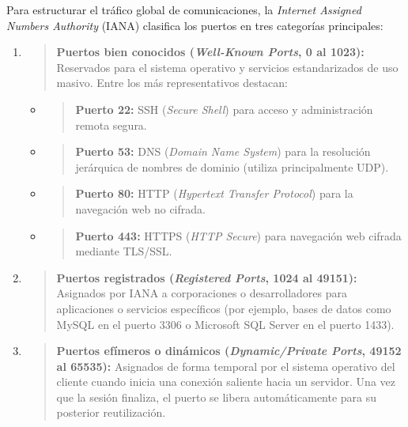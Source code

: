 
Para estructurar el tráfico global de comunicaciones, la \emph{Internet
Assigned Numbers Authority} (IANA) clasifica los puertos en tres
categorías principales:

\begin{enumerate}
\def\labelenumi{\arabic{enumi}.}
\item
  \begin{quote}
  \textbf{Puertos bien conocidos (\emph{Well-Known Ports}, 0 al 1023):}
  Reservados para el sistema operativo y servicios estandarizados de uso
  masivo. Entre los más representativos destacan:
  \end{quote}

  \begin{itemize}
  \item
    \begin{quote}
    \textbf{Puerto 22:} SSH (\emph{Secure Shell}) para acceso y
    administración remota segura.
    \end{quote}
  \item
    \begin{quote}
    \textbf{Puerto 53:} DNS (\emph{Domain Name System}) para la
    resolución jerárquica de nombres de dominio (utiliza principalmente
    UDP).
    \end{quote}
  \item
    \begin{quote}
    \textbf{Puerto 80:} HTTP (\emph{Hypertext Transfer Protocol}) para
    la navegación web no cifrada.
    \end{quote}
  \item
    \begin{quote}
    \textbf{Puerto 443:} HTTPS (\emph{HTTP Secure}) para navegación web
    cifrada mediante TLS/SSL.
    \end{quote}
  \end{itemize}
\item
  \begin{quote}
  \textbf{Puertos registrados (\emph{Registered Ports}, 1024 al 49151):}
  Asignados por IANA a corporaciones o desarrolladores para aplicaciones
  o servicios específicos (por ejemplo, bases de datos como MySQL en el
  puerto 3306 o Microsoft SQL Server en el puerto 1433).
  \end{quote}
\item
  \begin{quote}
  \textbf{Puertos efímeros o dinámicos (\emph{Dynamic/Private Ports},
  49152 al 65535):} Asignados de forma temporal por el sistema operativo
  del cliente cuando inicia una conexión saliente hacia un servidor. Una
  vez que la sesión finaliza, el puerto se libera automáticamente para
  su posterior reutilización.
  \end{quote}
\end{enumerate}

